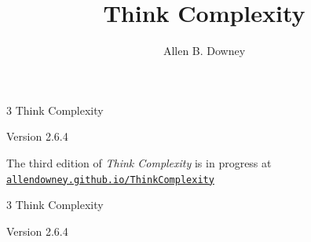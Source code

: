 \documentclass[12pt]{book}
\title{Think Complexity}
\author{Allen B. Downey}
\newcommand{\thetitle}{Think Complexity}
\newcommand{\theversion}{2.6.4}
\theoremstyle{exercise}
\newcommand\blankpage{%
    \null
    \thispagestyle{empty}%
    \addtocounter{page}{-1}%
    \newpage}
\newif\ifplastex
\begin{document}
\frontmatter

\ifplastex

\maketitle

\else

\begin{latexonly}


\thispagestyle{empty}

\begin{flushright}
\vspace*{2.0in}

\begin{spacing}{3}
{\huge \thetitle}
\end{spacing}

\vspace{0.25in}

Version \theversion

\vfill

{\large The third edition of \emph{Think Complexity} is in progress at\\
\href{https://allendowney.github.io/ThinkComplexity/}{\nolinkurl{allendowney.github.io/ThinkComplexity}}}

\end{flushright}


\afterpage{\blankpage}



\pagebreak
\thispagestyle{empty}

\begin{flushright}
\vspace*{2.0in}

\begin{spacing}{3}
{\huge \thetitle}
\end{spacing}

\vspace{0.25in}

Version \theversion

\vspace{1in}



\end{flushright}
\end{latexonly}
\end{document}

